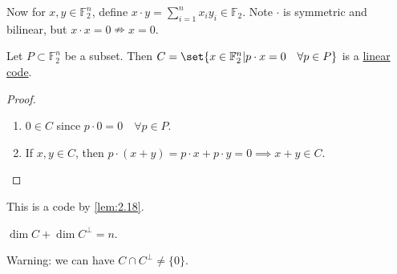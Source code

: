 \documentclass{article}
\newcommand{\F}{\mathbb{F}}
\newcommand{\1}[1]{\mathbbm{1}_{#1}}
\begin{document}
Now for $x, y \in \F_2^n$, define $x \cdot y = \sum_{i=1}^n x_i y_i \in \F_2$.
Note $\cdot$ is symmetric and bilinear, but $x \cdot x = 0 \nRightarrow x = 0$.
\begin{nlemma}\label{lem:2.18}
    Let $P \subset \mathbb{F}_2^n$ be a subset.
    Then $C = \set{x \in \mathbb{F}_2^n | p \cdot x = 0 \quad \forall p \in P}$ is a \hyperlink{def:linearCode}{linear code}.
\end{nlemma}
\begin{proof}
    \leavevmode
    \begin{enumerate}[label=(\roman*)]
        \item $0 \in C$ since $p \cdot 0 = 0 \quad \forall p \in P$.
        \item If $x, y \in C$, then $p \cdot (x+y) = p \cdot x + p \cdot y = 0 \implies x + y \in C$. \qedhere
    \end{enumerate}
\end{proof}
This is a code by \cref{lem:2.18}.
\begin{nlemma}\label{lem:2.19}
    $\dim C + \dim C^\perp = n$.
\end{nlemma}
Warning: we can have $C \cap C^\perp \neq \{0\}$.
\end{document}
